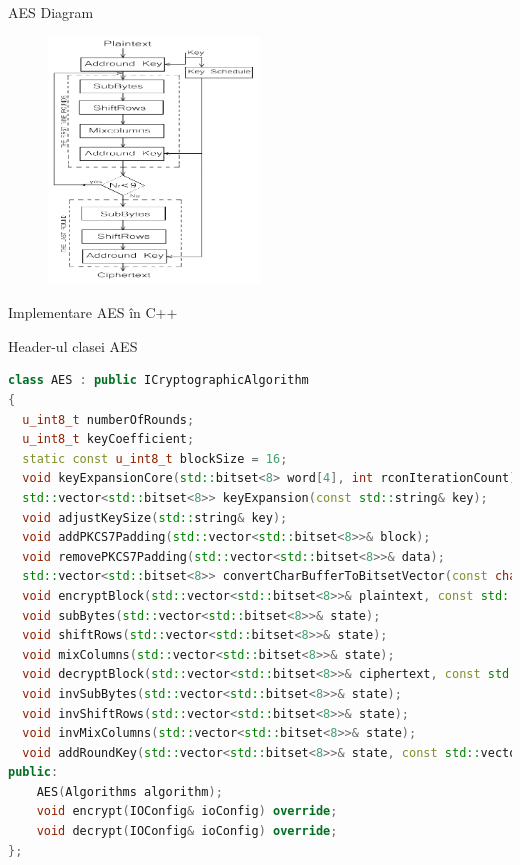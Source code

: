 \documentclass{beamer}
\begin{document}
\begin{frame}{AES Diagram}
  \begin{figure}
    \centering
    \includegraphics[width=0.5\textwidth]{images/aes_diagram.png}
  \end{figure}
\end{frame}

\begin{frame}[fragile]{Implementare AES în C++}
  \begin{block}{Header-ul clasei AES}
    \begin{lstlisting}[language=C++]
class AES : public ICryptographicAlgorithm
{
  u_int8_t numberOfRounds;
  u_int8_t keyCoefficient;
  static const u_int8_t blockSize = 16;
  void keyExpansionCore(std::bitset<8> word[4], int rconIterationCount);
  std::vector<std::bitset<8>> keyExpansion(const std::string& key);
  void adjustKeySize(std::string& key);
  void addPKCS7Padding(std::vector<std::bitset<8>>& block);
  void removePKCS7Padding(std::vector<std::bitset<8>>& data);
  std::vector<std::bitset<8>> convertCharBufferToBitsetVector(const char* buffer, size_t length);
  void encryptBlock(std::vector<std::bitset<8>>& plaintext, const std::vector<std::bitset<8>>& expandedKeys);
  void subBytes(std::vector<std::bitset<8>>& state);
  void shiftRows(std::vector<std::bitset<8>>& state);
  void mixColumns(std::vector<std::bitset<8>>& state);
  void decryptBlock(std::vector<std::bitset<8>>& ciphertext, const std::vector<std::bitset<8>>& expandedKeys);
  void invSubBytes(std::vector<std::bitset<8>>& state);
  void invShiftRows(std::vector<std::bitset<8>>& state);
  void invMixColumns(std::vector<std::bitset<8>>& state);
  void addRoundKey(std::vector<std::bitset<8>>& state, const std::vector<std::bitset<8>>& roundKey);
public:
    AES(Algorithms algorithm);
    void encrypt(IOConfig& ioConfig) override;
    void decrypt(IOConfig& ioConfig) override;
};
    \end{lstlisting}
  \end{block}
\end{frame}
\end{document}
